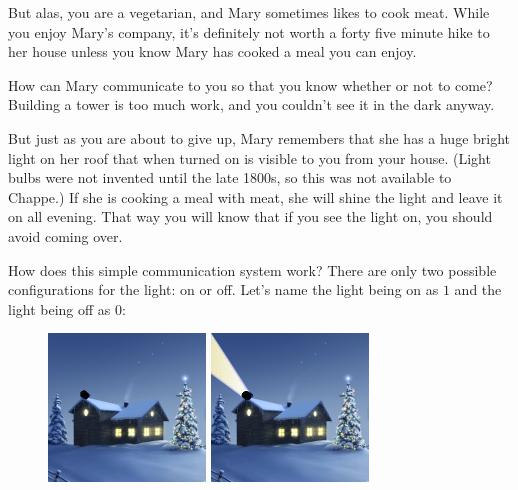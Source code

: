 \documentclass[UTF8]{book}
\begin{document}
\begin{CJK}{UTF8}{gbsn}
But alas, you are a vegetarian, and Mary sometimes likes to cook meat. While you enjoy Mary's company, it's definitely not worth a forty five minute hike to her house unless you know Mary has cooked a meal you can enjoy.

How can Mary communicate to you so that you know whether or not to come? Building a tower is too much work, and you couldn't see it in the dark anyway.

But just as you are about to give up, Mary remembers that she has a huge bright light on her roof that when turned on is visible to you from your house. (Light bulbs were not invented until the late 1800s, so this was not available to Chappe.) If she is cooking a meal with meat, she will shine the light and leave it on all evening. That way you will know that if you see the light on, you should avoid coming over.

How does this simple communication system work? There are only two possible configurations for the light: on or off. Let's name the light being on as $1$ and the light being off as $0$:


\begin{figure}[H]
\centering
\begin{minipage}{.5\textwidth}
  \centering
  \includegraphics[width=.5\linewidth]{house_on_hill_0}
\end{minipage}%
\begin{minipage}{.5\textwidth}
  \centering
  \includegraphics[width=.5\linewidth]{house_on_hill_1}
\end{minipage}
\end{figure}


\end{CJK}
\end{document}
